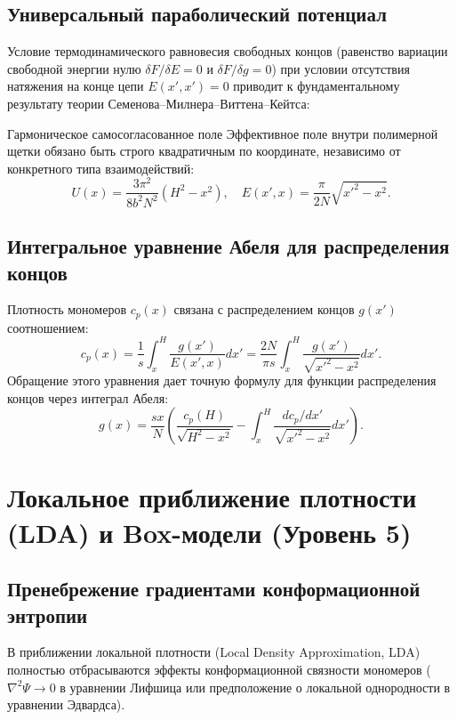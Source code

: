 \documentclass[12pt,a4paper]{article}
\begin{document}
\subsection{Универсальный параболический потенциал}
Условие термодинамического равновесия свободных концов (равенство вариации свободной энергии нулю $\delta F / \delta E = 0$ и $\delta F / \delta g = 0$) при условии отсутствия натяжения на конце цепи $E(x', x') = 0$ приводит к фундаментальному результату теории Семенова--Милнера--Виттена--Кейтса:
\begin{theorybox}{Гармоническое самосогласованное поле}
Эффективное поле внутри полимерной щетки обязано быть строго квадратичным по координате, независимо от конкретного типа взаимодействий:
\begin{equation}
U(x) = \frac{3\pi^2}{8 b^2 N^2} (H^2 - x^2), \quad E(x', x) = \frac{\pi}{2N}\sqrt{x'^2 - x^2}.
\end{equation}
\end{theorybox}

\subsection{Интегральное уравнение Абеля для распределения концов}
Плотность мономеров $c_p(x)$ связана с распределением концов $g(x')$ соотношением:
\begin{equation}
c_p(x) = \frac{1}{s} \int_x^H \frac{g(x')}{E(x', x)} dx' = \frac{2N}{\pi s} \int_x^H \frac{g(x')}{\sqrt{x'^2 - x^2}} dx'.
\end{equation}
Обращение этого уравнения дает точную формулу для функции распределения концов через интеграл Абеля:
\begin{equation}
g(x) = \frac{s x}{N} \left( \frac{c_p(H)}{\sqrt{H^2 - x^2}} - \int_x^H \frac{dc_p/dx'}{\sqrt{x'^2 - x^2}} dx' \right).
\end{equation}

\section{Локальное приближение плотности (LDA) и Box-модели (Уровень 5)}

\subsection{Пренебрежение градиентами конформационной энтропии}
В приближении локальной плотности (Local Density Approximation, LDA) полностью отбрасываются эффекты конформационной связности мономеров ($\nabla^2 \Psi \to 0$ в уравнении Лифшица или предположение о локальной однородности в уравнении Эдвардса).
\end{document}
